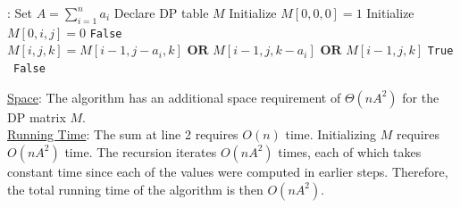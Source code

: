 \documentclass[twoside,11pt]{homework}
\newcommand\NoProc{\renewcommand\algorithmicprocedure{}}
\begin{document}
\begin{algorithm}
\begin{algorithmic}[1]
\NoProc
{}:  
\State Set $A = \sum_{i=1}^n a_i$
\State Declare DP table $M$
\State Initialize $M[0, 0, 0] = 1$ 
  
\State Initialize $M[0, i,  j] = 0$ 
\EndFor
{}
\State \Return \texttt{False}
\EndIf
{}
\State $M[i, j, k] = M[i-1, j- a_i,  k] \textbf{ OR } M[i-1, j, k-a_i] \textbf{ OR }  M[i-1, j, k]$
\EndFor
\EndFor
\EndFor
{}
\State \Return \texttt{True}
\Else \ \Return \texttt{False}
\EndIf
\EndProcedure 
\end{algorithmic}
\end{algorithm}


\noindent
\underline{Space}:  The algorithm has an additional space requirement of $\Theta(nA^2)$ for the DP matrix $M$.  \\


\noindent
\underline{Running Time}: The sum at line 2 requires $O(n)$ time.  Initializing $M$ requires $O(nA^2)$ time. The recursion iterates $O(nA^2)$ times,  each of which takes constant time since each of the values were computed in earlier steps.  Therefore,  the total running time of the algorithm is then $O(nA^2)$.   \\




\end{document}
